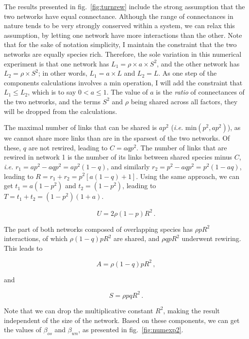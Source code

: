 \documentclass[11pt]{article}
\begin{document}
The results presented in fig.~\ref{fig:turnrew} include the strong
assumption that the two networks have equal connectance. Although the
range of connectances in nature tends to be very strongly conserved
within a system, we can relax this assumption, by letting one network
have more interactions than the other. Note that for the sake of
notation simplicity, I maintain the constraint that the two networks are
equally species rich. Therefore, the sole variation in this numerical
experiment is that one network has \(L_1 = \rho\times a\times S^2\), and
the other network has \(L_2 = \rho\times S^2\); in other words,
\(L_1 = a\times L\) and \(L_2 = L\). As one step of the components
calculations involves a \(\text{min}\) operation, I will add the
constraint that \(L_1 \le L_2\), which is to say \(0 < a \le 1\). The
value of \(a\) is the \emph{ratio} of connectances of the two networks,
and the terms \(S^2\) and \(\rho\) being shared across all factors, they
will be dropped from the calculations.

The maximal number of links that can be shared is \(ap^2\) (\emph{i.e.}
\(\text{min}(p^2, ap^2)\)), as we cannot share more links than are in
the sparsest of the two networks. Of these, \(q\) are not rewired,
leading to \(C = aqp^2\). The number of links that are rewired in
network 1 is the number of its links between shared species minus \(C\),
\emph{i.e.} \(r_1 = ap^2 - aqp^2 = ap^2(1-q)\), and similarly
\(r_2 = p^2 - aqp^2 = p^2(1-aq)\), leading to
\(R = r_1 + r_2 = p^2 \left[a(1-q)+1\right]\). Using the same approach,
we can get \(t_1 = a(1-p^2)\) and \(t_2 = (1-p^2)\), leading to
\(T = t_1 + t_2 = (1-p^2)(1+a)\).

\[U = 2\rho(1-p)R^2\,.\]

The part of both networks composed of overlapping species has
\(\rho pR^2\) interactions, of which \(\rho (1-q) p R^2\) are shared,
and \(\rho qp R^2\) underwent rewiring. This leads to

\[A = \rho (1-q) p R^2\,,\]

and

\[S = \rho pq R^2\,.\]

Note that we can drop the multiplicative constant \(R^2\), making the
result independent of the size of the network. Based on these
components, we can get the values of \(\beta_{os}\) and \(\beta_{wn}\),
as presented in fig.~\ref{fig:numexp2}.
\end{document}
